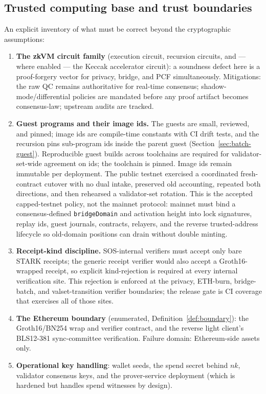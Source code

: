 \documentclass[11pt]{article}
\newcommand{\code}[1]{\texttt{#1}}
\theoremstyle{plain}
\theoremstyle{definition}
\theoremstyle{remark}
\begin{document}
\subsection{Trusted computing base and trust boundaries}
\label{sec:tcb}

An explicit inventory of what must be correct beyond the cryptographic
assumptions:

\begin{enumerate}[leftmargin=1.6em]
\item \textbf{The zkVM circuit family} (execution circuit, recursion
  circuits, and --- where enabled --- the Keccak accelerator circuit): a
  soundness defect here is a proof-forgery vector for privacy, bridge, and
  PCF simultaneously. Mitigations: the raw QC remains authoritative for
  real-time consensus; shadow-mode/differential policies are mandated before
  any proof artifact becomes consensus-law; upstream audits are tracked.
\item \textbf{Guest programs and their image ids.} The guests are small,
  reviewed, and pinned; image ids are compile-time constants with CI drift
  tests, and the recursion pins sub-program ids inside the parent guest
  (Section~\ref{sec:batch-guest}). Reproducible guest builds across
  toolchains are required for validator-set-wide agreement on ids; the
  toolchain is pinned. Image ids remain immutable per deployment. The public
  testnet exercised a coordinated fresh-contract cutover with no dual intake,
  preserved old accounting, repeated both directions, and then rehearsed a
  validator-set rotation. This is the accepted capped-testnet policy, not the
  mainnet protocol: mainnet must bind a consensus-defined
  \code{bridgeDomain} and activation height into lock signatures, replay ids,
  guest journals, contracts, relayers, and the reverse trusted-address
  lifecycle so old-domain positions can drain without double minting.
\item \textbf{Receipt-kind discipline.} SOS-internal verifiers must accept
  only bare STARK receipts; the generic receipt verifier would also accept
  a Groth16-wrapped receipt, so explicit kind-rejection is required at
  every internal verification site. This rejection is enforced at the
  privacy, ETH-burn, bridge-batch, and valset-transition verifier boundaries;
  the release gate is CI coverage that exercises all of those sites.
\item \textbf{The Ethereum boundary} (enumerated, Definition~\ref{def:boundary}):
  the Groth16/BN254 wrap and verifier contract, and the reverse light
  client's BLS12-381 sync-committee verification. Failure domain:
  Ethereum-side assets only.
\item \textbf{Operational key handling}: wallet seeds, the spend secret
  behind $\mathit{nk}$, validator consensus keys, and the prover-service
  deployment (which is hardened but handles spend witnesses by design).
\end{enumerate}
\end{document}
